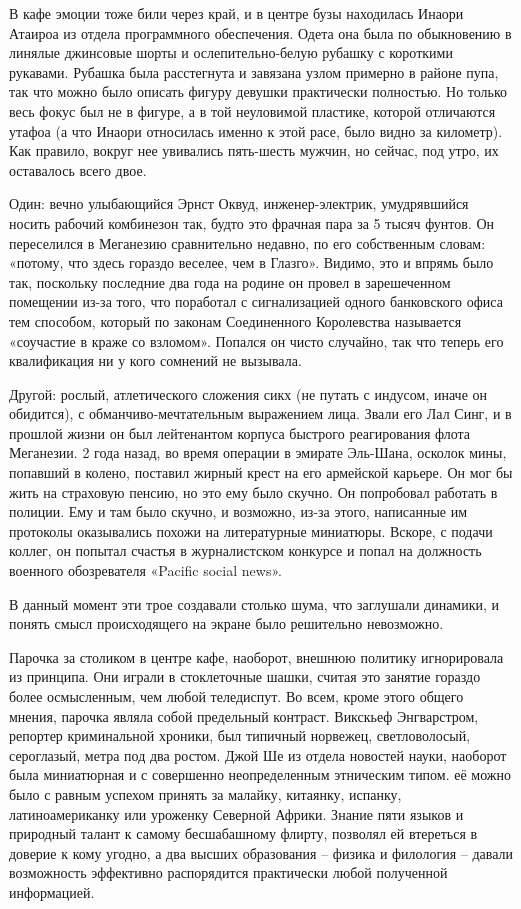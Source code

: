 \documentclass{book}
\begin{document}
В кафе эмоции тоже били через край, и в центре бузы находилась Инаори Атаироа из отдела программного обеспечения. Одета она была по обыкновению в линялые джинсовые шорты и ослепительно-белую рубашку с короткими рукавами. Рубашка была расстегнута и завязана узлом примерно в районе пупа, так что можно было описать фигуру девушки практически полностью. Но только весь фокус был не в фигуре, а в той неуловимой пластике, которой отличаются утафоа (а что Инаори относилась именно к этой расе, было видно за километр). Как правило, вокруг нее увивались пять-шесть мужчин, но сейчас, под утро, их оставалось всего двое.

Один: вечно улыбающийся Эрнст Оквуд, инженер-электрик, умудрявшийся носить рабочий комбинезон так, будто это фрачная пара за 5 тысяч фунтов. Он переселился в Меганезию сравнительно недавно, по его собственным словам: «потому, что здесь гораздо веселее, чем в Глазго». Видимо, это и впрямь было так, поскольку последние два года на родине он провел в зарешеченном помещении из-за того, что поработал с сигнализацией одного банковского офиса тем способом, который по законам Соединенного Королевства называется «соучастие в краже со взломом». Попался он чисто случайно, так что теперь его квалификация ни у кого сомнений не вызывала.

Другой: рослый, атлетического сложения сикх (не путать с индусом, иначе он обидится), с обманчиво-мечтательным выражением лица. Звали его Лал Синг, и в прошлой жизни он был лейтенантом корпуса быстрого реагирования флота Меганезии. 2 года назад, во время операции в эмирате Эль-Шана, осколок мины, попавший в колено, поставил жирный крест на его армейской карьере. Он мог бы жить на страховую пенсию, но это ему было скучно. Он попробовал работать в полиции. Ему и там было скучно, и возможно, из-за этого, написанные им протоколы оказывались похожи на литературные миниатюры. Вскоре, с подачи коллег, он попытал счастья в журналистском конкурсе и попал на должность военного обозревателя «Pacific social news».

В данный момент эти трое создавали столько шума, что заглушали динамики, и понять смысл происходящего на экране было решительно невозможно.

Парочка за столиком в центре кафе, наоборот, внешнюю политику игнорировала из принципа. Они играли в стоклеточные шашки, считая это занятие гораздо более осмысленным, чем любой теледиспут. Во всем, кроме этого общего мнения, парочка являла собой предельный контраст. Викскьеф Энгварстром, репортер криминальной хроники, был типичный норвежец, светловолосый, сероглазый, метра под два ростом. Джой Ше из отдела новостей науки, наоборот была миниатюрная и с совершенно неопределенным этническим типом. её можно было с равным успехом принять за малайку, китаянку, испанку, латиноамериканку или уроженку Северной Африки. Знание пяти языков и природный талант к самому бесшабашному флирту, позволял ей втереться в доверие к кому угодно, а два высших образования -- физика и филология -- давали возможность эффективно распорядится практически любой полученной информацией.
\end{document}
